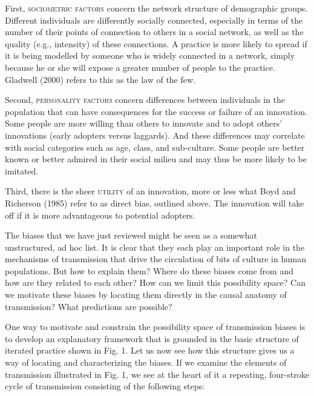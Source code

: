 First, \textsc{sociometric factors} concern the network structure of 
demographic groups. Different individuals are differently socially 
connected, especially in terms of the number of their points of 
connection to others in a social network, as well as the quality (e.g., 
intensity) of these connections. A practice is more likely to spread if 
it is being modelled by someone who is widely connected in a network, 
simply because he or she will expose a greater number of people to the 
practice. Gladwell (2000) refers to this as the law of the few. 



Second, \textsc{personality factors} concern differences between 
individuals in the population that can have consequences for the success 
or failure of an innovation. Some people are more willing than others to 
innovate and to adopt others' innovations (early adopters versus 
laggards). And these differences may correlate with social categories 
such as age, class, and sub-culture. Some people are better known or 
better admired in their social milieu and may thus be more likely to be 
imitated. 



Third, there is the sheer \textsc{utility} of an innovation, more or 
less what Boyd and Richerson (1985) refer to as direct bias, outlined 
above. The innovation will take off if it is more advantageous to 
potential adopters. 



The biases that we have just reviewed might be seen as a somewhat 
unstructured, ad hoc list. It is clear that they each play an important 
role in the mechanisms of transmission that drive the circulation of 
bits of culture in human populations. But how to explain them? Where do 
these biases come from and how are they related to each other? How can 
we limit this possibility space? Can we motivate these biases by 
locating them directly in the causal anatomy of transmission? What 
predictions are possible? 



One way to motivate and constrain the possibility space of transmission 
biases is to develop an explanatory framework that is grounded in the 
basic structure of iterated practice shown in Fig. 1. Let us now see how 
this structure gives us a way of locating and characterizing the biases. 
If we examine the elements of transmission illustrated in Fig. 1, we see 
at the heart of it a repeating, four-stroke cycle of transmission 
consisting of the following steps: 



